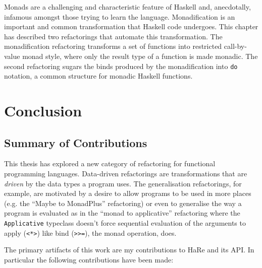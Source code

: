 Monads are a challenging and characteristic feature of Haskell and, anecdotally, infamous amongst those trying to learn the language. Monadification is an important and common transformation that Haskell code undergoes. This chapter has described two refactorings that automate this transformation. The monadification refactoring transforms a set of functions into restricted call-by-value monad style, where only the result type of a function is made monadic. The second refactoring sugars the binds produced by the monadification into \texttt{do} notation, a common structure for monadic Haskell functions.



\chapter{Conclusion}
\label{chp:conc}

\section{Summary of Contributions}

This thesis has explored a new category of refactoring for functional programming languages. Data-driven refactorings are transformations that are \textit{driven} by the data types a program uses. The generalisation refactorings, for example, are motivated by a desire to allow programs to be used in more places (e.g. the ``Maybe to MonadPlus'' refactoring) or even to generalise the way a program is evaluated as in the ``monad to applicative'' refactoring where the \texttt{Applicative} typeclass doesn't force sequential evaluation of the arguments to apply (\texttt{<*>}) like bind (\texttt{>>=}), the monad operation, does.

The primary artifacts of this work are my contributions to HaRe and its API. In particular the following contributions have been made:


